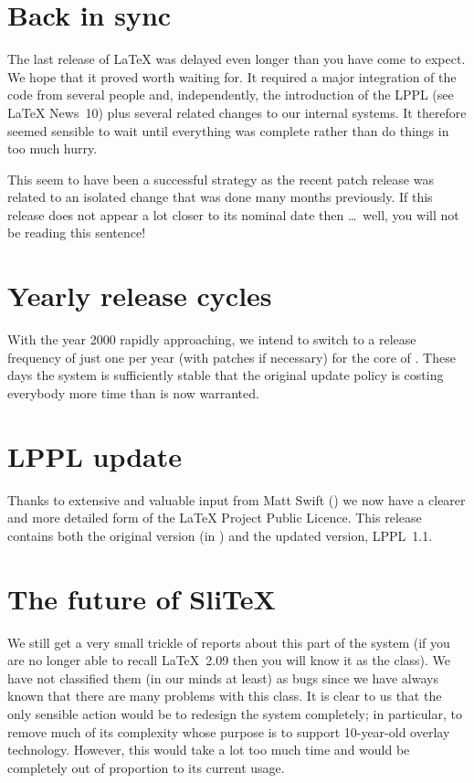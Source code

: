 \documentclass{ltnews}
\begin{document}
\maketitle

\section{Back in sync}

The  last release of \LaTeX{} was delayed even longer than you have
come to expect.  We hope that it proved worth waiting for.  It
required a major integration of the code from several people and,
independently, the introduction of the LPPL (see \LaTeX{} News~10) plus
several related changes to our internal systems.  It therefore seemed
sensible to wait until everything was complete rather than do things
in too much hurry.

This seem to have been a successful strategy as
the recent patch release was related to an isolated change that was
done many months previously.  If this release does not appear a lot
closer to its nominal date then \ldots~well, you will not be reading
this sentence!

\section{Yearly release cycles}

With the year 2000 rapidly approaching, we intend to switch to a
release frequency of just one per year (with patches if necessary) for
the core of \LaTeXe{}. These days the system is sufficiently stable
that the original update policy is costing everybody more time than is
now warranted.

\section{LPPL update}

Thanks to extensive and valuable input from Matt Swift
() we now have a clearer and more detailed
form of the \LaTeX{} Project Public Licence.  This release contains
both the original version (in ) and the updated
version, LPPL~1.1.

\section{The future of Sli\TeX{}}

We still get a very small trickle of reports about this part of the
system (if you are no longer able to recall \LaTeX~2.09 then you will
know it as the  class).  We have not classified them (in
our minds at least) as bugs since we have always known that there are
many problems with this class.  It is clear to us that the only
sensible action would be to redesign the system completely; in
particular, to remove much of its complexity whose purpose is to
support 10-year-old overlay technology.  However, this would take a
lot too much time and would be completely out of proportion to its
current usage.
\end{document}
